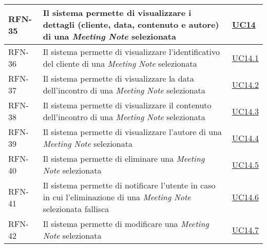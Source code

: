 \begin{table}
\begin{tabularx}{\textwidth}{lXl}
\hline
RFN-35 \label{RFN-35} & Il sistema permette di visualizzare i dettagli (cliente, data, contenuto e autore) di una \emph{Meeting Note} selezionata & \hyperref[UC14]{UC14} \\
\hline
RFN-36 \label{RFN-36} & Il sistema permette di visualizzare l'identificativo del cliente di una \emph{Meeting Note} selezionata & \hyperref[UC14.1]{UC14.1} \\
\hline
RFN-37 \label{RFN-37} & Il sistema permette di visualizzare la data dell'incontro di una \emph{Meeting Note} selezionata & \hyperref[UC14.2]{UC14.2} \\
\hline
RFN-38 \label{RFN-38} & Il sistema permette di visualizzare il contenuto dell'incontro di una \emph{Meeting Note} selezionata & \hyperref[UC14.3]{UC14.3} \\
\hline
RFN-39 \label{RFN-39} & Il sistema permette di visualizzare l'autore di una \emph{Meeting Note} selezionata & \hyperref[UC14.4]{UC14.4} \\
\hline
RFN-40 \label{RFN-40} & Il sistema permette di eliminare una \emph{Meeting Note} selezionata & \hyperref[UC14.5]{UC14.5} \\
\hline
RFN-41 \label{RFN-41} & Il sistema permette di notificare l'utente in caso in cui l'eliminazione di una \emph{Meeting Note} selezionata fallisca & \hyperref[UC14.6]{UC14.6} \\
\hline
RFN-42 \label{RFN-42} & Il sistema permette di modificare una \emph{Meeting Note} selezionata & \hyperref[UC14.7]{UC14.7} \\
\hline
\end{tabularx}
\end{table}

\clearpage

